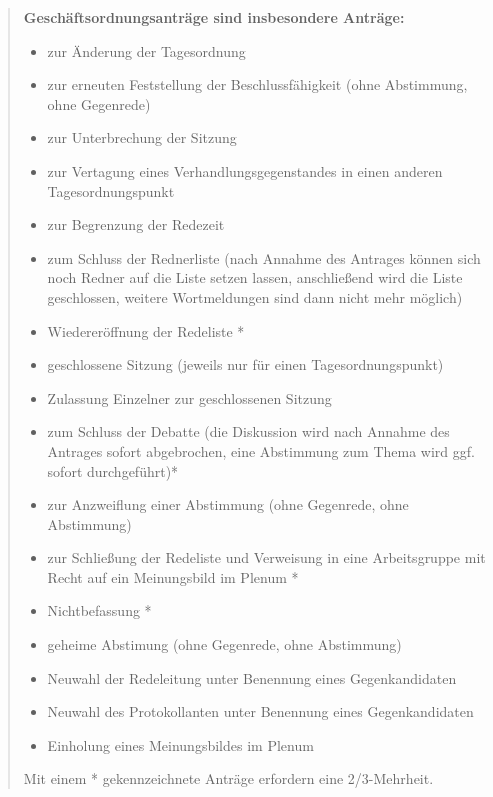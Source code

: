\begin{enumerate}
  \begin{quote}
    \textbf{Geschäftsordnungsanträge sind insbesondere Anträge:}
    \begin{itemize}
      \item zur Änderung der Tagesordnung
      \item zur erneuten Feststellung der Beschlussfähigkeit (ohne Abstimmung, ohne Gegenrede)
      \item zur Unterbrechung der Sitzung
      \item zur Vertagung eines Verhandlungsgegenstandes in einen anderen Tagesordnungspunkt
      \item zur Begrenzung der Redezeit
      \item zum Schluss der Rednerliste (nach Annahme des Antrages können sich noch Redner auf die Liste
            setzen lassen, anschließend wird die Liste geschlossen, weitere Wortmeldungen sind dann nicht
            mehr möglich)
      \item Wiedereröffnung der Redeliste *
      \item geschlossene Sitzung (jeweils nur für einen Tagesordnungspunkt)
      \item Zulassung Einzelner zur geschlossenen Sitzung
      \item zum Schluss der Debatte (die Diskussion wird nach Annahme des Antrages sofort abgebrochen, eine
            Abstimmung zum Thema wird ggf. sofort durchgeführt)*
      \item zur Anzweiflung einer Abstimmung (ohne Gegenrede, ohne Abstimmung)
      \item zur Schließung der Redeliste und Verweisung in eine Arbeitsgruppe mit Recht auf ein Meinungsbild im Plenum *
      \item Nichtbefassung *
      \item geheime Abstimung (ohne Gegenrede, ohne Abstimmung)
      \item Neuwahl der Redeleitung unter Benennung eines Gegenkandidaten
      \item Neuwahl des Protokollanten unter Benennung eines Gegenkandidaten
      \item Einholung eines Meinungsbildes im Plenum
    \end{itemize}
    Mit einem * gekennzeichnete Anträge erfordern eine 2/3-Mehrheit.
  \end{quote}
\end{enumerate}

